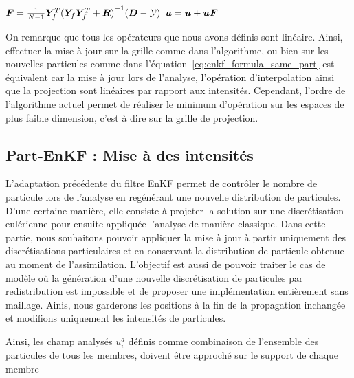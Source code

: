 \begin{itemize}
\begin{algorithm}
    $ \bm{F} = \frac{1}{N-1}\bm Y_f^T {(\bm Y_f \bm Y_f^T + \bm R)}^{-1}(\bm{D} - \mathcal{Y})$ 
    $\bm u = \bm u + \bm u \bm{F}$ 
\end{algorithm}


On remarque que tous les opérateurs que nous avons définis sont linéaire. Ainsi, effectuer la mise à jour sur la grille comme dans l'algorithme, ou bien sur les nouvelles particules comme dans l'équation~\eqref{eq:enkf_formula_same_part} est équivalent car la mise à jour lors de l'analyse, l'opération d'interpolation ainsi que la projection sont linéaires par rapport aux intensités.
Cependant, l'ordre de l'algorithme actuel permet de réaliser le minimum d'opération sur les espaces de plus faible dimension, c'est à dire sur la grille de projection.

\subsection{Part-EnKF : Mise à des intensités}

L'adaptation précédente du filtre EnKF permet de contrôler le nombre de particule lors de l'analyse en regénérant une nouvelle distribution de particules. D'une certaine manière, elle consiste à projeter la solution sur une discrétisation eulérienne pour ensuite appliquée l'analyse de manière classique.
Dans cette partie, nous souhaitons pouvoir appliquer la mise à jour à partir uniquement des discrétisations particulaires et en conservant la distribution de particule obtenue au moment de l'assimilation. L'objectif est aussi de pouvoir traiter le cas de modèle où la génération d'une nouvelle discrétisation de particules par redistribution est impossible et de proposer une implémentation entièrement sans maillage.
Ainis, nous garderons les positions à la fin de la propagation inchangée et modifions uniquement les intensités de particules.

Ainsi, les champ analysés $u_i^a$ définis comme combinaison de l'ensemble des particules de tous les membres, doivent être approché sur le support de chaque membre


\end{itemize}
